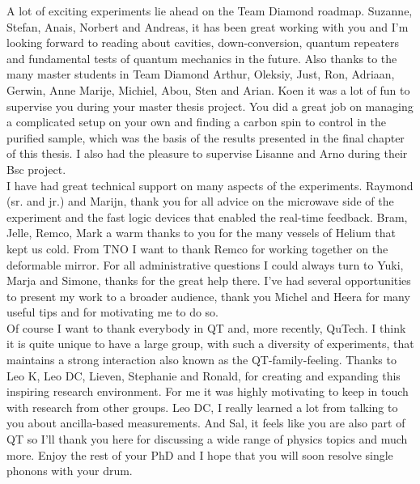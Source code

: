 A lot of exciting experiments lie ahead on the Team Diamond roadmap. Suzanne, Stefan, Anais, Norbert and Andreas, it has been great working with you and I'm looking forward to reading about cavities, down-conversion, quantum repeaters and fundamental tests of quantum mechanics in the future. Also thanks to the many master students in Team Diamond Arthur, Oleksiy, Just, Ron, Adriaan, Gerwin, Anne Marije, Michiel, Abou, Sten and Arian. Koen it was a lot of fun to supervise you during your master thesis project. You did a great job on managing a complicated setup on your own and finding a carbon spin to control in the purified sample, which was the basis of the results presented in the final chapter of this thesis. I also had the pleasure to supervise Lisanne and Arno during their Bsc project. \\

I have had great technical support on many aspects of the experiments. Raymond (sr. and jr.) and Marijn, thank you for all advice on the microwave side of the experiment and the fast logic devices that enabled the real-time feedback. Bram, Jelle, Remco, Mark a warm thanks to you for the many vessels of Helium that kept us cold. From TNO I want to thank Remco for working together on the deformable mirror. For all administrative questions I could always turn to Yuki, Marja and Simone, thanks for the great help there. I've had several opportunities to present my work to a broader audience, thank you Michel and Heera for many useful tips and for motivating me to do so.\\

Of course I want to thank everybody in QT and, more recently, QuTech. I think it is quite unique to have a large group, with such a diversity of experiments, that maintains a strong interaction also known as the QT-family-feeling. Thanks to Leo K, Leo DC, Lieven, Stephanie and Ronald, for creating and expanding this inspiring research environment. For me it was highly motivating to keep in touch with research from other groups. Leo DC, I really learned a lot from talking to you about ancilla-based measurements. And Sal, it feels like you are also part of QT so I'll thank you here for discussing a wide range of physics topics and much more. Enjoy the rest of your PhD and I hope that you will soon resolve single phonons with your drum.

